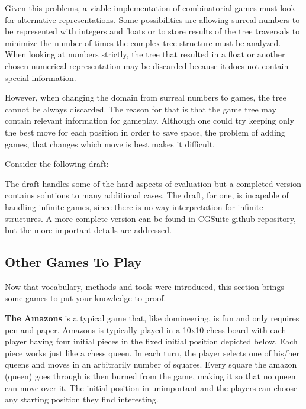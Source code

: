

Given this problems, a viable implementation of combinatorial games must look for alternative representations. Some possibilities are allowing surreal numbers to be represented with integers and floats or to store results of the tree traversals to minimize the number of times the complex tree structure must be analyzed. When looking at numbers strictly, the tree that resulted in a float or another chosen numerical representation may be discarded because it does not contain special information.

However, when changing the domain from surreal numbers to games, the tree cannot be always discarded. The reason for that is that the game tree may contain relevant information for gameplay. Although one could try keeping only the best move for each position in order to save space, the problem of adding games, that changes which move is best makes it difficult.

Consider the following draft:



The draft handles some of the hard aspects of evaluation but a completed version contains solutions to many additional cases. The draft, for one, is incapable of handling infinite games, since there is no way interpretation for infinite structures. A more complete version can be found in CGSuite github repository, but the more important details are addressed.

\subsection*{Other Games To Play}

Now that vocabulary, methods and tools were introduced, this section brings some games to put your knowledge to proof.

\textbf{The Amazons} is a typical game that, like domineering, is fun and only requires pen and paper. Amazons is typically played in a 10x10 chess board with each player having four initial pieces in the fixed initial position depicted below. Each piece works just like a chess queen. In each turn, the player selects one of his/her queens and moves in an arbitrarily number of squares. Every square the amazon (queen) goes through is then burned from the game, making it so that no queen can move over it. The initial position in unimportant and the players can choose any starting position they find interesting.

